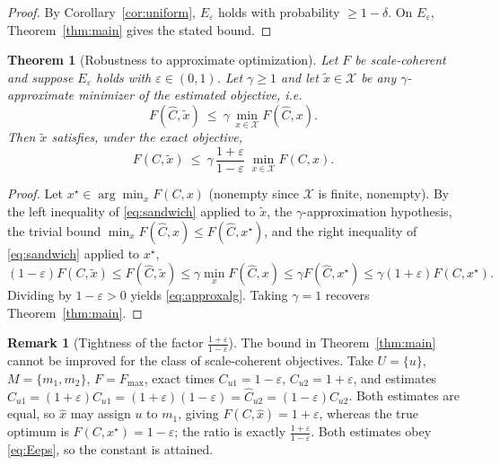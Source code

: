 \documentclass{amsart}
\newtheorem{theorem}{Theorem}
\theoremstyle{definition}
\newtheorem{remark}{Remark}
\newcommand{\Chat}{\widehat{C}}
\begin{document}
\begin{proof}
By Corollary~\ref{cor:uniform}, $E_\varepsilon$ holds with probability
$\ge1-\delta$. On $E_\varepsilon$, Theorem~\ref{thm:main} gives the stated bound.
\end{proof}

\begin{theorem}[Robustness to approximate optimization]\label{thm:approxalg}
Let $F$ be scale-coherent and suppose $E_\varepsilon$ holds with
$\varepsilon\in(0,1)$. Let $\gamma\ge 1$ and let $\tilde x\in\mathcal X$ be any
$\gamma$-approximate minimizer of the estimated objective, i.e.
\[
F(\Chat,\tilde x)\ \le\ \gamma\,\min_{x\in\mathcal X} F(\Chat,x).
\]
Then $\tilde x$ satisfies, under the exact objective,
\begin{equation}\label{eq:approxalg}
F(C,\tilde x)\ \le\ \gamma\,\frac{1+\varepsilon}{1-\varepsilon}\;\min_{x\in\mathcal X}F(C,x).
\end{equation}
\end{theorem}

\begin{proof}
Let $x^\star\in\arg\min_x F(C,x)$ (nonempty since $\mathcal X$ is finite,
nonempty). By the left inequality of \eqref{eq:sandwich} applied to $\tilde x$,
the $\gamma$-approximation hypothesis, the trivial bound
$\min_x F(\Chat,x)\le F(\Chat,x^\star)$, and the right inequality of
\eqref{eq:sandwich} applied to $x^\star$,
\[
(1-\varepsilon)F(C,\tilde x)\le F(\Chat,\tilde x)
\le \gamma\min_x F(\Chat,x)
\le \gamma F(\Chat,x^\star)
\le \gamma(1+\varepsilon)F(C,x^\star).
\]
Dividing by $1-\varepsilon>0$ yields \eqref{eq:approxalg}. Taking $\gamma=1$
recovers Theorem~\ref{thm:main}.
\end{proof}

\begin{remark}[Tightness of the factor $\tfrac{1+\varepsilon}{1-\varepsilon}$]\label{rem:tight}
The bound in Theorem~\ref{thm:main} cannot be improved for the class of
scale-coherent objectives. Take $U=\{u\}$, $M=\{m_1,m_2\}$, $F=F_{\max}$, exact
times $C_{u1}=1-\varepsilon$, $C_{u2}=1+\varepsilon$, and estimates
$\Chat_{u1}=(1+\varepsilon)C_{u1}=(1+\varepsilon)(1-\varepsilon)=\Chat_{u2}
=(1-\varepsilon)C_{u2}$. Both estimates are equal, so $\hat x$ may assign $u$ to
$m_1$, giving $F(C,\hat x)=1+\varepsilon$, whereas the true optimum is
$F(C,x^\star)=1-\varepsilon$; the ratio is exactly
$\frac{1+\varepsilon}{1-\varepsilon}$. Both estimates obey \eqref{eq:Eeps}, so the
constant is attained.
\end{remark}
\end{document}

